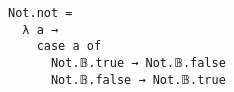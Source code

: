 \begin{verbatim}
Not.not =
  λ a →
    case a of
      Not.𝔹.true → Not.𝔹.false
      Not.𝔹.false → Not.𝔹.true
\end{verbatim}
